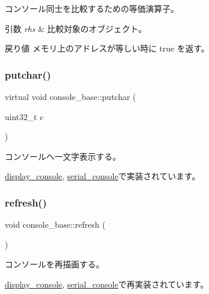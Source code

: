 コンソール同士を比較するための等価演算子。 
\begin{DoxyParams}{引数}
{\em rhs} & 比較対象のオブジェクト。 \\
\hline
\end{DoxyParams}
\begin{DoxyReturn}{戻り値}
メモリ上のアドレスが等しい時に true を返す。 
\end{DoxyReturn}
\hypertarget{classconsole__base_a584c38d4ca34363f399895e30133b814}{}\label{classconsole__base_a584c38d4ca34363f399895e30133b814} 
\subsubsection{\texorpdfstring{putchar()}{putchar()}}
{\footnotesize\ttfamily virtual void console\+\_\+base\+::putchar (\begin{DoxyParamCaption}\item[{uint32\+\_\+t}]{c }\end{DoxyParamCaption})\hspace{0.3cm}{\ttfamily [pure virtual]}}

コンソールへ一文字表示する。 

\hyperlink{classdisplay__console_a06e4aae84b14832a690bb915a33f54f0}{display\+\_\+console}, \hyperlink{classserial__console_aa75329918015828987a4327d183e82fc}{serial\+\_\+console}で実装されています。

\hypertarget{classconsole__base_abd597aeba24dbc8552479b58db052980}{}\label{classconsole__base_abd597aeba24dbc8552479b58db052980} 
\subsubsection{\texorpdfstring{refresh()}{refresh()}}
{\footnotesize\ttfamily void console\+\_\+base\+::refresh (\begin{DoxyParamCaption}{ }\end{DoxyParamCaption})\hspace{0.3cm}{\ttfamily [virtual]}}

コンソールを再描画する。 

\hyperlink{classdisplay__console_a94dcd0e51a5227c807c59c99c6a739c9}{display\+\_\+console}, \hyperlink{classserial__console_ab652d9c5c8122739dfa377625f457333}{serial\+\_\+console}で再実装されています。

